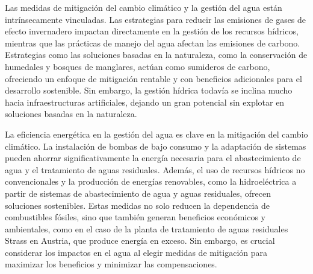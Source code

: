 

Las medidas de mitigación del cambio climático y la gestión del agua están intrínsecamente vinculadas. Las estrategias para reducir las emisiones de gases de efecto invernadero impactan directamente en la gestión de los recursos hídricos, mientras que las prácticas de manejo del agua afectan las emisiones de carbono. Estrategias como las soluciones basadas en la naturaleza, como la conservación de humedales y bosques de manglares, actúan como sumideros de carbono, ofreciendo un enfoque de mitigación rentable y con beneficios adicionales para el desarrollo sostenible. Sin embargo, la gestión hídrica todavía se inclina mucho hacia infraestructuras artificiales, dejando un gran potencial sin explotar en soluciones basadas en la naturaleza.\cite{ONU2019AguaCambioClimatico}

La eficiencia energética en la gestión del agua es clave en la mitigación del cambio climático. La instalación de bombas de bajo consumo y la adaptación de sistemas pueden ahorrar significativamente la energía necesaria para el abastecimiento de agua y el tratamiento de aguas residuales. Además, el uso de recursos hídricos no convencionales y la producción de energías renovables, como la hidroeléctrica a partir de sistemas de abastecimiento de agua y aguas residuales, ofrecen soluciones sostenibles. Estas medidas no solo reducen la dependencia de combustibles fósiles, sino que también generan beneficios económicos y ambientales, como en el caso de la planta de tratamiento de aguas residuales Strass en Austria, que produce energía en exceso. Sin embargo, es crucial considerar los impactos en el agua al elegir medidas de mitigación para maximizar los beneficios y minimizar las compensaciones.\cite{ONU2019AguaCambioClimatico}
